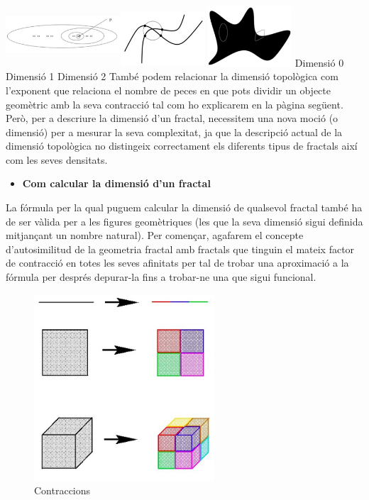 \documentclass[12pt]{report}
\begin{document}
\includegraphics[width=0.8\textwidth]{Top.PNG}
\newline
\newline
\newline
\hspace*{4.5em}Dimensió 0 \hspace*{7.5em} Dimensió 1 \hspace*{7em} Dimensió 2
\newline
\newline
També podem relacionar la dimensió topològica com l'exponent que relaciona el nombre de peces en que pots dividir un objecte geomètric amb la seva contracció tal com ho explicarem en la pàgina següent.
\newline
Però, per a descriure la dimensió d'un fractal, necessitem una nova moció (o dimensió) per a mesurar la seva complexitat, ja que la descripció actual de la dimensió topològica no distingeix correctament els diferents tipus de fractals així com les seves densitats.
\begin{itemize}
\item \textbf{Com calcular la dimensió d'un fractal}
\end{itemize}
La fórmula per la qual puguem calcular la dimensió de qualsevol fractal també ha de ser vàlida per a les figures geomètriques (les que la seva dimensió sigui definida mitjançant un nombre natural).
\newline Per començar, agafarem el concepte d'autosimilitud de la geometria fractal amb fractals que tinguin el mateix factor de contracció en totes les seves afinitats per tal de trobar una aproximació a la fórmula per després depurar-la fins a trobar-ne una que sigui funcional.

\begin{figure}
    \includegraphics[width=0.6\textwidth]{Relacion-pieza-Dimension.PNG}
    \caption{Contraccions}
    \end{figure}
\end{document}
